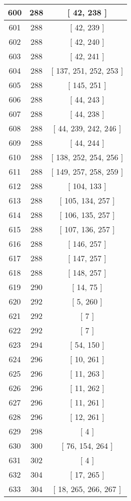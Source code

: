\begin{center}
\begin{longtable}[H]{|| c c c ||}
\hline
600 & 288 & [ 42, 238 ] \\ 
\hline
601 & 288 & [ 42, 239 ] \\ 
\hline
602 & 288 & [ 42, 240 ] \\ 
\hline
603 & 288 & [ 42, 241 ] \\ 
\hline
604 & 288 & [ 137, 251, 252, 253 ] \\ 
\hline
605 & 288 & [ 145, 251 ] \\ 
\hline
606 & 288 & [ 44, 243 ] \\ 
\hline
607 & 288 & [ 44, 238 ] \\ 
\hline
608 & 288 & [ 44, 239, 242, 246 ] \\ 
\hline
609 & 288 & [ 44, 244 ] \\ 
\hline
610 & 288 & [ 138, 252, 254, 256 ] \\ 
\hline
611 & 288 & [ 149, 257, 258, 259 ] \\ 
\hline
612 & 288 & [ 104, 133 ] \\ 
\hline
613 & 288 & [ 105, 134, 257 ] \\ 
\hline
614 & 288 & [ 106, 135, 257 ] \\ 
\hline
615 & 288 & [ 107, 136, 257 ] \\ 
\hline
616 & 288 & [ 146, 257 ] \\ 
\hline
617 & 288 & [ 147, 257 ] \\ 
\hline
618 & 288 & [ 148, 257 ] \\ 
\hline
619 & 290 & [ 14, 75 ] \\ 
\hline
620 & 292 & [ 5, 260 ] \\ 
\hline
621 & 292 & [ 7 ] \\ 
\hline
622 & 292 & [ 7 ] \\ 
\hline
623 & 294 & [ 54, 150 ] \\ 
\hline
624 & 296 & [ 10, 261 ] \\ 
\hline
625 & 296 & [ 11, 263 ] \\ 
\hline
626 & 296 & [ 11, 262 ] \\ 
\hline
627 & 296 & [ 11, 261 ] \\ 
\hline
628 & 296 & [ 12, 261 ] \\ 
\hline
629 & 298 & [ 4 ] \\ 
\hline
630 & 300 & [ 76, 154, 264 ] \\ 
\hline
631 & 302 & [ 4 ] \\ 
\hline
632 & 304 & [ 17, 265 ] \\ 
\hline
633 & 304 & [ 18, 265, 266, 267 ] \\ 

\end{longtable}
\end{center}
